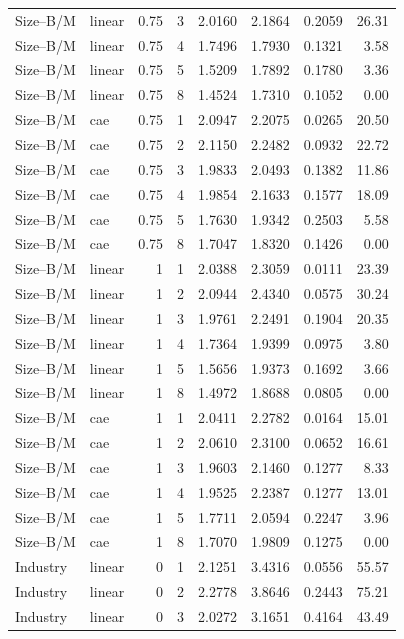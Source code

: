 \begin{longtable}{llrrrrrr}
Size--B/M & linear & 0.75 & 3 & 2.0160 & 2.1864 & 0.2059 & 26.31 \\
Size--B/M & linear & 0.75 & 4 & 1.7496 & 1.7930 & 0.1321 & 3.58 \\
Size--B/M & linear & 0.75 & 5 & 1.5209 & 1.7892 & 0.1780 & 3.36 \\
Size--B/M & linear & 0.75 & 8 & 1.4524 & 1.7310 & 0.1052 & 0.00 \\
Size--B/M & cae & 0.75 & 1 & 2.0947 & 2.2075 & 0.0265 & 20.50 \\
Size--B/M & cae & 0.75 & 2 & 2.1150 & 2.2482 & 0.0932 & 22.72 \\
Size--B/M & cae & 0.75 & 3 & 1.9833 & 2.0493 & 0.1382 & 11.86 \\
Size--B/M & cae & 0.75 & 4 & 1.9854 & 2.1633 & 0.1577 & 18.09 \\
Size--B/M & cae & 0.75 & 5 & 1.7630 & 1.9342 & 0.2503 & 5.58 \\
Size--B/M & cae & 0.75 & 8 & 1.7047 & 1.8320 & 0.1426 & 0.00 \\
Size--B/M & linear & 1 & 1 & 2.0388 & 2.3059 & 0.0111 & 23.39 \\
Size--B/M & linear & 1 & 2 & 2.0944 & 2.4340 & 0.0575 & 30.24 \\
Size--B/M & linear & 1 & 3 & 1.9761 & 2.2491 & 0.1904 & 20.35 \\
Size--B/M & linear & 1 & 4 & 1.7364 & 1.9399 & 0.0975 & 3.80 \\
Size--B/M & linear & 1 & 5 & 1.5656 & 1.9373 & 0.1692 & 3.66 \\
Size--B/M & linear & 1 & 8 & 1.4972 & 1.8688 & 0.0805 & 0.00 \\
Size--B/M & cae & 1 & 1 & 2.0411 & 2.2782 & 0.0164 & 15.01 \\
Size--B/M & cae & 1 & 2 & 2.0610 & 2.3100 & 0.0652 & 16.61 \\
Size--B/M & cae & 1 & 3 & 1.9603 & 2.1460 & 0.1277 & 8.33 \\
Size--B/M & cae & 1 & 4 & 1.9525 & 2.2387 & 0.1277 & 13.01 \\
Size--B/M & cae & 1 & 5 & 1.7711 & 2.0594 & 0.2247 & 3.96 \\
Size--B/M & cae & 1 & 8 & 1.7070 & 1.9809 & 0.1275 & 0.00 \\
Industry & linear & 0 & 1 & 2.1251 & 3.4316 & 0.0556 & 55.57 \\
Industry & linear & 0 & 2 & 2.2778 & 3.8646 & 0.2443 & 75.21 \\
Industry & linear & 0 & 3 & 2.0272 & 3.1651 & 0.4164 & 43.49 \\

\end{longtable}
